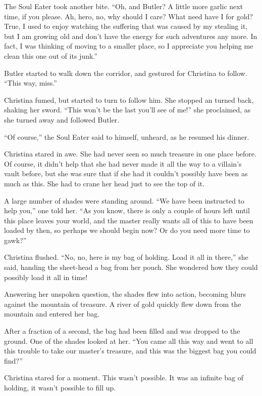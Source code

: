 \documentclass[showtrims,b6paper,draft,10pt]{memoir}
\begin{document}
The Soul Eater took another bite.  ``Oh, and Butler?  A little more garlic next time, if you please.  Ah, hero, no, why should I care?  What need have I for gold?  True, I used to enjoy watching the suffering that was caused by my stealing it, but I am growing old and don't have the energy for such adventures any more.  In fact, I was thinking of moving to a smaller place, so I appreciate you helping me clean this one out of its junk.''

Butler started to walk down the corridor, and gestured for Christina to follow.  ``This way, miss.''

Christina fumed, but started to turn to follow him.  She stopped an turned back, shaking her sword.  ``This won't be the last you'll see of me!'' she proclaimed, as she turned away and followed Butler.

``Of course,'' the Soul Eater said to himself, unheard, as he resumed his dinner.

\timeskip
Christina stared in awe.  She had never seen so much treasure in one place before.  Of course, it didn't help that she had never made it all the way to a villain's vault before, but she was sure that if she had it couldn't possibly have been as much as this.  She had to crane her head just to see the top of it.

A large number of shades were standing around.  ``We have been instructed to help you,'' one told her.  ``As you know, there is only a couple of hours left until this place leaves your world, and the master really wants all of this to have been loaded by then, so perhaps we should begin now?  Or do you need more time to gawk?''

Christina flushed.  ``No, no, here is my bag of holding.  Load it all in there,'' she said, handing the sheet-head a bag from her pouch.  She wondered how they could possibly load it all in time!

Answering her unspoken question, the shades flew into action, becoming blurs against the mountain of treasure.  A river of gold quickly flew down from the mountain and entered her bag.

After a fraction of a second, the bag had been filled and was dropped to the ground.  One of the shades looked at her.  ``You came all this way and went to all this trouble to take our master's treasure, and this was the biggest bag you could find?''

Christina stared for a moment.  This wasn't possible.  It was an infinite bag of holding, it wasn't possible to fill up.
\end{document}
